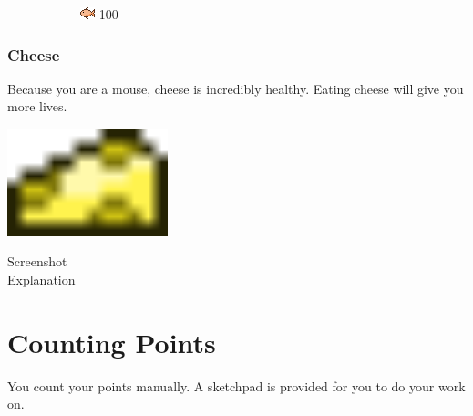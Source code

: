 \documentclass[12pt]{book}
\begin{document}
\begin{figure}[h]
					\hspace{1mm}
					\begin{subfigure}[t]{0.16\textwidth}
						\centering
						\includegraphics[width=\textwidth]{OrangeFish}
						100
					\end{subfigure}
				\end{figure}
			\subsection{Cheese}
				Because you are a mouse, cheese is incredibly healthy. Eating cheese will give you more lives.
				\begin{center}
					\includegraphics[width=0.35\textwidth]{Cheese}
				\end{center}
		{\Huge Screenshot\\Explanation}
	\chapter{Counting Points}
		You count your points manually. A sketchpad is provided for you to do your work on.
		
\end{document}
